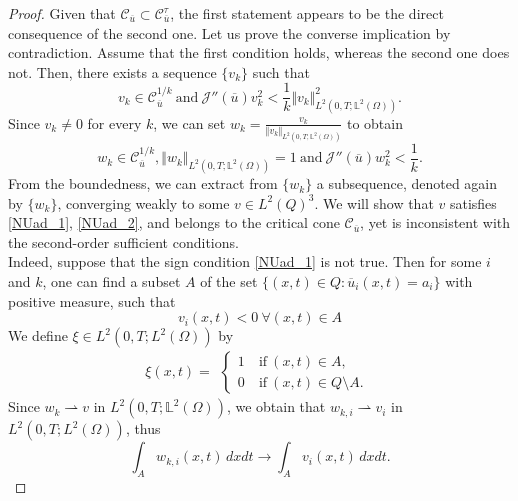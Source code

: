 \documentclass[reqno]{amsart}
\begin{document}
	\begin{proof}
		Given that $\mathcal{C}_{\overline{u}} \subset \mathcal{C}_{\overline{u}}^\tau$, the first statement appears to be the direct consequence of the second one. 
		Let us prove the converse implication by contradiction. Assume that the first condition holds, whereas the second one does not. Then, there exists a sequence $\{ v_k \} $ such that
		\begin{equation*}
			v_k \in \mathcal{C}_{\overline{u}}^{1/k} \ \text{and} \ \mathcal{J}''(\overline{u}
			)v_k^2 < \frac{1}{k} \Vert v_k \Vert_{L^2(0,T;\mathbb{L}^2(\Omega))}^2.
		\end{equation*}
		Since $v_k \ne 0$ for every $k$, we can set $w_k = \frac{v_k}{\Vert v_k \Vert_{L^2(0,T;\mathbb{L}^2(\Omega))}}$ to obtain
		\begin{equation} \label{5.3.1}
			w_k \in \mathcal{C}_{\overline{u}}^{1/k}, \Vert w_k \Vert_{L^2(0,T;\mathbb{L}^2(\Omega))}=1 \ \text{and} \ \mathcal{J}''(\overline{u})w_k^2 < \frac{1}{k}.
		\end{equation}
		From the boundedness, we can extract from $\{ w_k\}$ a subsequence, denoted again by $\{ w_k\}$, converging weakly to some $v \in L^2(Q)^3$. We will show that $v$ satisfies \eqref{NUad_1}, \eqref{NUad_2}, and belongs to the critical cone $\mathcal{C}_{\overline{u}}$, yet is inconsistent with the second-order sufficient conditions. \\
		Indeed, suppose that the sign condition \eqref{NUad_1} is not true. Then for some $i$ and $k$, one can find a subset $A$ of the set $\{(x,t) \in Q: \overline{u}_i(x,t) = a_i \} $ with positive measure, such that 
		\begin{equation} \label{5.3.2}
			v_i(x,t) <0 \ \forall  (x,t) \in A
		\end{equation}
		We define $\xi \in L^2(0,T;L^2(\Omega))$ by
		\begin{equation*} \xi(x,t)=
			\begin{aligned}
				\begin{cases}
					1 \ &\text{if} \ (x,t) \in A,\\
					0 \ &\text{if} \ (x,t) \in Q \setminus A.
				\end{cases}
			\end{aligned}
		\end{equation*}
		Since $w_k \rightharpoonup v$ in $L^2(0,T;\mathbb{L}^2(\Omega))$, we obtain that $w_{k,i} \rightharpoonup v_i$ in $L^2(0,T;L^2(\Omega))$, thus
		\begin{equation*}
			\int_A w_{k,i} (x,t) \, dxdt \rightarrow \int_A v_i(x,t) \, dxdt.

\end{equation*}
\end{proof}
\end{document}

